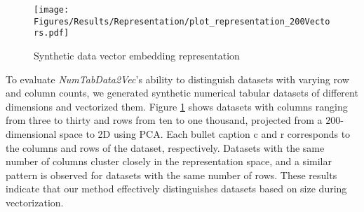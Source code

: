 \begin{figure}[!ht]
    \centering
    \texttt{[image: Figures/Results/Representation/plot\_representation\_200Vectors.pdf]}
    \caption{Synthetic data vector embedding representation}
    \label{fig:eval-sd-data-repr}
\end{figure}

To evaluate \textit{NumTabData2Vec}'s ability to distinguish datasets with varying row and column counts, we generated synthetic numerical tabular datasets of different dimensions and vectorized them. Figure \ref{fig:eval-sd-data-repr} shows datasets with columns ranging from three to thirty and rows from ten to one thousand, projected from a $200$-dimensional space to 2D using PCA. Each bullet caption c and r corresponds to the columns and rows of the dataset, respectively. Datasets with the same number of columns cluster closely in the representation space, and a similar pattern is observed for datasets with the same number of rows. These results indicate that our method effectively distinguishes datasets based on size during vectorization.

